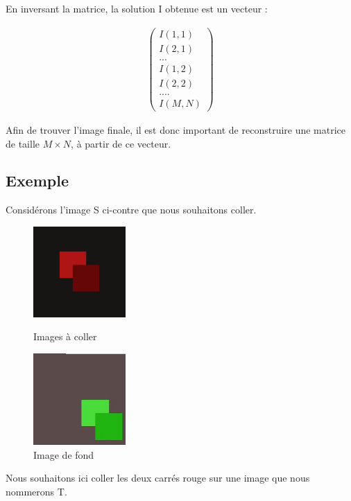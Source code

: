 En inversant la matrice, la solution I obtenue est un vecteur : 
\begin{center}
\begin{equation*}
\left.
\begin{aligned}
\begin{pmatrix}
I(1,1)\\
I(2,1)\\
...\\
I(1,2)\\
I(2,2)\\
....\\
I(M, N)
\end{pmatrix}
\end{aligned}
\right.
\end{equation*}
\end{center}
Afin de trouver l'image finale, il est donc important de reconstruire une matrice de taille $M\times N$, à partir de ce vecteur. 

\subsection{Exemple}
Considérons l'image S ci-contre que nous souhaitons coller. 
\begin{figure}[!htb]
   \begin{minipage}{0.5\textwidth}
     \centering
     \includegraphics[width = 100pt]{Images/square.png}
     \caption{Images à coller}
      \end{minipage}\hfill
   \begin{minipage}{0.5\textwidth}
     \centering
\includegraphics[width = 100pt]{Images/targer.png}
\caption{Image de fond}
      \end{minipage}\hfill
\end{figure}
Nous souhaitons ici coller les deux carrés rouge sur une image que nous nommerons T.  

